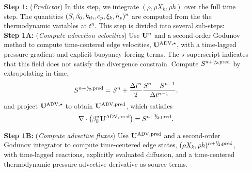 {\bf Step 1:} ({\it Predictor}) In this step, we integrate $(\rho, \rho X_k, \rho h)$ over the full time step.  The quantities $(S, \beta_0, k_{\rm th}, c_p, \xi_k, h_p)^n$ are computed from the the thermodynamic variables at $t^n$.  This step is divided into several sub-steps:\\

{\bf Step 1A:} ({\it Compute advection velocities}) Use ${\bf U}^n$ and a second-order Godunov method to compute time-centered edge velocities, $\mathbf{U}^{\mathrm{ADV},\star}$, with a time-lagged pressure gradient and explicit buoyancy forcing terms.  The $\star$ superscript indicates that this field does not satisfy the divergence constrain.  Compute $S^{n+\myhalf,{\rm pred}}$ by extrapolating in time,
\begin{equation}
S^{n+\myhalf,{\rm pred}} = S^n + \frac{\Delta t^n}{2}\frac{S^n - S^{n-1}}{\Delta t^{n-1}},
\end{equation}
and project $\mathbf{U}^{\mathrm{ADV},\star}$ to obtain $\mathbf{U}^{\mathrm{ADV},\mathrm{pred}}$, which satisfies
\begin{equation}
\nabla\cdot\left(\beta_0^n\uadvsdcpred\right) = S^{n+\myhalf,\rm{pred}}.
\end{equation}

{\bf Step 1B:} ({\it Compute advective fluxes}) Use $\mathbf{U}^{\mathrm{ADV},\mathrm{pred}}$ and a second-order Godunov integrator to compute time-centered edge states, $(\rho X_k, \rho h)^{n+\myhalf,{\rm pred}}$, with time-lagged reactions, explicitly evaluated diffusion, and a time-centered thermodynamic pressure advective derivative as source terms.\\

